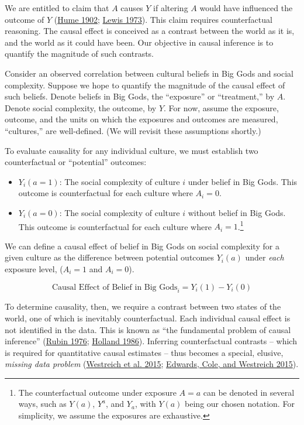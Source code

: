 \documentclass[
  singlecolumn]{article}
\providecommand{\tightlist}{%
  \setlength{\itemsep}{0pt}\setlength{\parskip}{0pt}}\usepackage{longtable,booktabs,array}
\begin{document}
We are entitled to claim that \(A\) causes \(Y\) if altering \(A\) would
have influenced the outcome of \(Y\)
(\protect\hyperlink{ref-hume1902}{Hume 1902};
\protect\hyperlink{ref-lewis1973}{Lewis 1973}). This claim requires
counterfactual reasoning. The causal effect is conceived as a contrast
between the world as it is, and the world as it could have been. Our
objective in causal inference is to quantify the magnitude of such
contrasts.

Consider an observed correlation between cultural beliefs in Big Gods
and social complexity. Suppose we hope to quantify the magnitude of the
causal effect of such beliefs. Denote beliefs in Big Gods, the
``exposure'' or ``treatment,'' by \(A\). Denote social complexity, the
outcome, by \(Y\). For now, assume the exposure, outcome, and the units
on which the exposures and outcomes are measured, ``cultures,'' are
well-defined. (We will revisit these assumptions shortly.)

To evaluate causality for any individual culture, we must establish two
counterfactual or ``potential'' outcomes:

\begin{itemize}
\tightlist
\item
  \(Y_i(a = 1)\): The social complexity of culture \(i\) under belief in
  Big Gods. This outcome is counterfactual for each culture where
  \(A_i = 0\).
\item
  \(Y_i(a = 0)\): The social complexity of culture \(i\) without belief
  in Big Gods. This outcome is counterfactual for each culture where
  \(A_i = 1\).\footnote{The counterfactual outcome under exposure
    \(A = a\) can be denoted in several ways, such as \(Y(a)\),
    \(Y^{a}\), and \(Y_a\), with \(Y(a)\) being our chosen notation. For
    simplicity, we assume the exposures are exhaustive.}
\end{itemize}

We can define a causal effect of belief in Big Gods on social complexity
for a given culture as the difference between potential outcomes
\(Y_i(a)\) under \emph{each} exposure level, (\(A_i = 1\) and
\(A_i = 0\)).

\[
\text{Causal Effect of Belief in Big Gods}_i = Y_i(1) - Y_i(0) 
\]

To determine causality, then, we require a contrast between two states
of the world, one of which is inevitably counterfactual. Each individual
causal effect is not identified in the data. This is known as ``the
fundamental problem of causal inference''
(\protect\hyperlink{ref-rubin1976}{Rubin 1976};
\protect\hyperlink{ref-holland1986}{Holland 1986}). Inferring
counterfactual contrasts -- which is required for quantitative causal
estimates -- thus becomes a special, elusive, \emph{missing data
problem} (\protect\hyperlink{ref-westreich2015}{Westreich et al. 2015};
\protect\hyperlink{ref-edwards2015}{Edwards, Cole, and Westreich 2015}).
\end{document}
